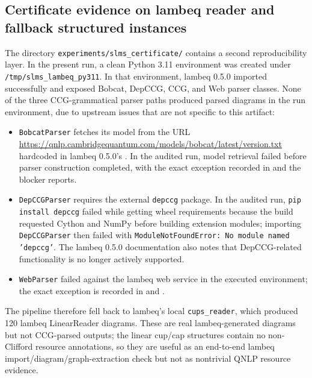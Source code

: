 \subsection{Certificate evidence on lambeq reader and fallback structured instances}

The directory \texttt{experiments/slms\_certificate/} contains a second reproducibility layer. In the present run, a clean Python 3.11 environment was created under \texttt{/tmp/slms\_lambeq\_py311}. In that environment, lambeq 0.5.0 imported successfully and exposed Bobcat, DepCCG, CCG, and Web parser classes. None of the three CCG-grammatical parser paths produced parsed diagrams in the run environment, due to upstream issues that are not specific to this artifact:
\begin{itemize}[leftmargin=1.2cm]
\sloppy
\item \texttt{BobcatParser} fetches its model from the URL \url{https://qnlp.cambridgequantum.com/models/bobcat/latest/version.txt} hardcoded in lambeq 0.5.0's . In the audited run, model retrieval failed before parser construction completed, with the exact exception recorded in  and the blocker reports.
\item \texttt{DepCCGParser} requires the external \texttt{depccg} package. In the audited run, \texttt{pip install depccg} failed while getting wheel requirements because the build requested Cython and NumPy before building extension modules; importing \texttt{DepCCGParser} then failed with \texttt{ModuleNotFoundError: No module named 'depccg'}. The lambeq 0.5.0 documentation also notes that DepCCG-related functionality is no longer actively supported.
\item \texttt{WebParser} failed against the lambeq web service in the executed environment; the exact exception is recorded in  and .
\end{itemize}
The pipeline therefore fell back to lambeq's local \texttt{cups\_reader}, which produced 120 lambeq LinearReader diagrams. These are real lambeq-generated diagrams but not CCG-parsed outputs; the linear cup/cap structures contain no non-Clifford resource annotations, so they are useful as an end-to-end lambeq import/diagram/graph-extraction check but not as nontrivial QNLP resource evidence.

